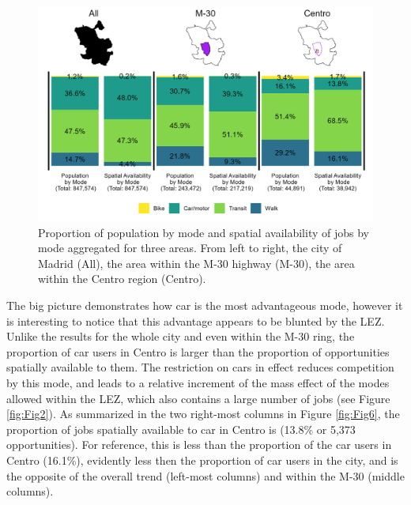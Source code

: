 \documentclass[10pt,letterpaper]{article}
\begin{document}
\begin{figure}

{\centering \includegraphics[width=0.85\linewidth]{images/Fig6} 

}

\caption{\label{fig:Fig6} Proportion of population by mode and spatial availability of jobs by mode aggregated for three areas. From left to right, the city of Madrid (All), the area within the M-30 highway (M-30), the area within the Centro region (Centro).}\label{fig:modal-V-comps-plot}
\end{figure}

The big picture demonstrates how car is the most advantageous mode,
however it is interesting to notice that this advantage appears to be
blunted by the LEZ. Unlike the results for the whole city and even
within the M-30 ring, the proportion of car users in Centro is larger
than the proportion of opportunities spatially available to them. The
restriction on cars in effect reduces competition by this mode, and
leads to a relative increment of the mass effect of the modes allowed
within the LEZ, which also contains a large number of jobs (see Figure
\ref{fig:Fig2}). As summarized in the two right-most columns in Figure
\ref{fig:Fig6}, the proportion of jobs spatially available to car in
Centro is (13.8\% or 5,373 opportunities). For reference, this is less
than the proportion of the car users in Centro (16.1\%), evidently less
then the proportion of car users in the city, and is the opposite of the
overall trend (left-most columns) and within the M-30 (middle columns).
\end{document}
